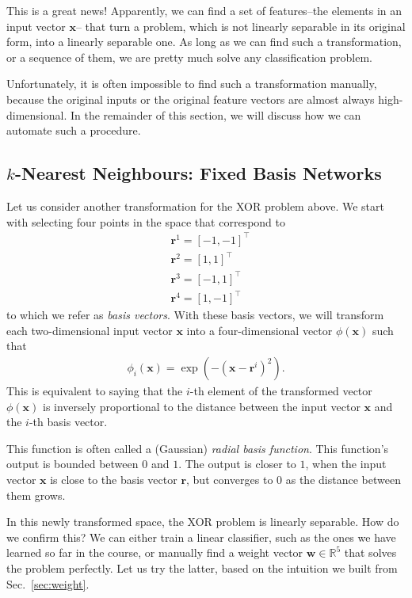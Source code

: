 \documentclass{report}
\newcommand{\vect}[1]{\mathbf{#1}}
\newcommand{\vx}[0]{\vect{x}}
\newcommand{\vw}[0]{\vect{w}}
\newcommand{\vr}[0]{\vect{r}}
\newcommand{\RR}[0]{\mathbb{R}}
\begin{document}
This is a great news! Apparently, we can find a set of features--the elements in
an input vector $\vx$-- that turn a problem, which is not linearly separable in
its original form, into a linearly separable one. As long as we can find such a
transformation, or a sequence of them, we are pretty much solve any
classification problem.  

Unfortunately, it is  often impossible to find such a transformation manually,
because the original inputs or the original feature vectors are almost always
high-dimensional. In the remainder of this section, we will discuss how we can
automate such a procedure. 

\subsection{$k$-Nearest Neighbours: Fixed Basis Networks}

Let us consider another transformation for the XOR problem above. We start with
selecting four points in the space that correspond to 
\begin{align*}
    &\vr^1 = [-1, -1]^\top \\
    &\vr^2 = [1, 1]^\top \\
    &\vr^3 = [-1, 1]^\top \\
    &\vr^4 = [1, -1]^\top 
\end{align*}
to which we refer as {\it basis vectors}. With these basis vectors, we will
transform each two-dimensional input vector $\vx$ into a four-dimensional vector
$\phi(\vx)$ such that
\begin{align}
    \label{eq:rbf}
    \phi_i(\vx) = \exp\left( -(\vx - \vr^i)^2 \right).
\end{align}
This is equivalent to saying that the $i$-th element of the transformed vector
$\phi(\vx)$ is inversely proportional to the distance between the input vector
$\vx$ and the $i$-th basis vector. 

This function is often called a (Gaussian) {\it radial basis function}. This
function's output is bounded between $0$ and $1$. The output is closer to $1$,
when the input vector $\vx$ is close to the basis vector $\vr$, but converges to
$0$ as the distance between them grows. 

In this newly transformed space, the XOR problem is linearly separable. How do
we confirm this? We can either train a linear classifier, such as the ones we
have learned so far in the course, or manually find a weight vector $\vw \in
\RR^5$ that solves the problem perfectly. Let us try the latter, based on the
intuition we built from Sec.~\ref{sec:weight}.
\end{document}
